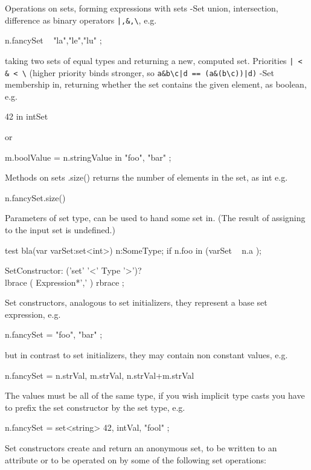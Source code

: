 Operations on sets, forming expressions with sets
-Set union, intersection, difference as binary operators \verb#|,&,\#, e.g. 
\begin{grgenlet}
n.fancySet \ { "la","le","lu" };
\end{grgenlet}
taking two sets of equal types and returning a new, computed set.
Priorities \verb#| < & < \# (higher priority binds stronger, so
\verb#a&b\c|d == (a&(b\c))|d)#
-Set membership in, returning whether the set contains the given element, as boolean, e.g. \begin{grgenlet}
42 in intSet
\end{grgenlet}
or
\begin{grgenlet}
m.boolValue = n.stringValue in { "foo", "bar" };
\end{grgenlet}

Methods on sets
.size() returns the number of elements in the set, as int
e.g.
\begin{grgenlet}
n.fancySet.size()
\end{grgenlet}

Parameters of set type, can be used to hand some set in.
(The result of assigning to the input set is undefined.)
\begin{grgen}
test bla(var varSet:set<int>) 
{
	n:SomeType;
	if { n.foo in (varSet \ { n.a }); }
}
\end{grgen}

\begin{rail} 
  SetConstructor: ('set' '<' Type '>')? \\ lbrace ( Expression*',' ) rbrace ;
\end{rail}

Set constructors, analogous to set initializers, they represent a base set expression, e.g. 
\begin{grgenlet}
n.fancySet = { "foo", "bar" };
\end{grgenlet}
but in contrast to set initializers, they may contain non constant values, e.g. 
\begin{grgenlet}
n.fancySet = { n.strVal, m.strVal, n.strVal+m.strVal }
\end{grgenlet}
The values must be all of the same type, if you wish implicit type casts
you have to prefix the set constructor by the set type, e.g.
\begin{grgenlet}
n.fancySet = set<string>{ 42, intVal, "fool" };
\end{grgenlet}
Set constructors create and return an anonymous set,
to be written to an attribute or to be operated on by some of the following set operations:

